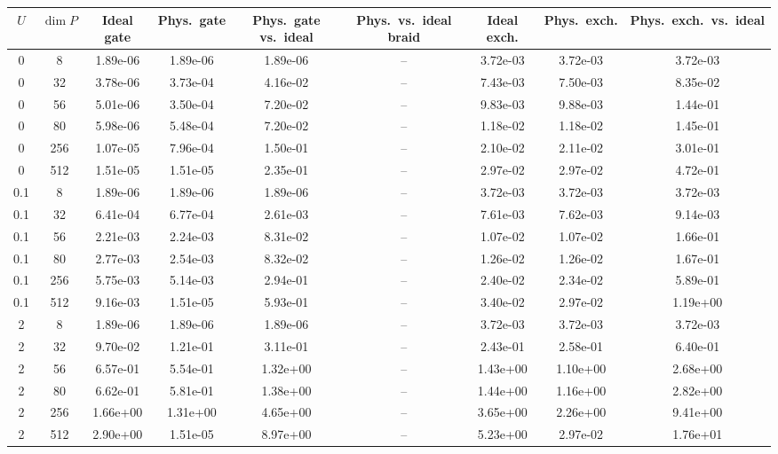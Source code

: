 \begin{tabular}{ccccccccc}
\hline
$U$ & $\dim P$ & Ideal gate & Phys.\ gate & Phys.\ gate vs.\ ideal & Phys.\ vs.\ ideal braid & Ideal exch. & Phys.\ exch. & Phys.\ exch.\ vs.\ ideal \\
\hline
0 & 8 & 1.89e-06 & 1.89e-06 & 1.89e-06 & -- & 3.72e-03 & 3.72e-03 & 3.72e-03 \\
0 & 32 & 3.78e-06 & 3.73e-04 & 4.16e-02 & -- & 7.43e-03 & 7.50e-03 & 8.35e-02 \\
0 & 56 & 5.01e-06 & 3.50e-04 & 7.20e-02 & -- & 9.83e-03 & 9.88e-03 & 1.44e-01 \\
0 & 80 & 5.98e-06 & 5.48e-04 & 7.20e-02 & -- & 1.18e-02 & 1.18e-02 & 1.45e-01 \\
0 & 256 & 1.07e-05 & 7.96e-04 & 1.50e-01 & -- & 2.10e-02 & 2.11e-02 & 3.01e-01 \\
0 & 512 & 1.51e-05 & 1.51e-05 & 2.35e-01 & -- & 2.97e-02 & 2.97e-02 & 4.72e-01 \\
\hline
0.1 & 8 & 1.89e-06 & 1.89e-06 & 1.89e-06 & -- & 3.72e-03 & 3.72e-03 & 3.72e-03 \\
0.1 & 32 & 6.41e-04 & 6.77e-04 & 2.61e-03 & -- & 7.61e-03 & 7.62e-03 & 9.14e-03 \\
0.1 & 56 & 2.21e-03 & 2.24e-03 & 8.31e-02 & -- & 1.07e-02 & 1.07e-02 & 1.66e-01 \\
0.1 & 80 & 2.77e-03 & 2.54e-03 & 8.32e-02 & -- & 1.26e-02 & 1.26e-02 & 1.67e-01 \\
0.1 & 256 & 5.75e-03 & 5.14e-03 & 2.94e-01 & -- & 2.40e-02 & 2.34e-02 & 5.89e-01 \\
0.1 & 512 & 9.16e-03 & 1.51e-05 & 5.93e-01 & -- & 3.40e-02 & 2.97e-02 & 1.19e+00 \\
\hline
2 & 8 & 1.89e-06 & 1.89e-06 & 1.89e-06 & -- & 3.72e-03 & 3.72e-03 & 3.72e-03 \\
2 & 32 & 9.70e-02 & 1.21e-01 & 3.11e-01 & -- & 2.43e-01 & 2.58e-01 & 6.40e-01 \\
2 & 56 & 6.57e-01 & 5.54e-01 & 1.32e+00 & -- & 1.43e+00 & 1.10e+00 & 2.68e+00 \\
2 & 80 & 6.62e-01 & 5.81e-01 & 1.38e+00 & -- & 1.44e+00 & 1.16e+00 & 2.82e+00 \\
2 & 256 & 1.66e+00 & 1.31e+00 & 4.65e+00 & -- & 3.65e+00 & 2.26e+00 & 9.41e+00 \\
2 & 512 & 2.90e+00 & 1.51e-05 & 8.97e+00 & -- & 5.23e+00 & 2.97e-02 & 1.76e+01 \\
\hline
\end{tabular}
